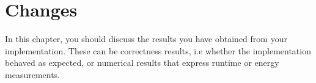 \chapter{Changes}
In this chapter, you should discuss the results you have obtained from your implementation.
These can be correctness results, i.e whether the implementation behaved as expected, or numerical results that express runtime or energy measurements.